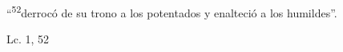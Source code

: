 \documentclass[../../rosario.tex]{subfiles}
\begin{document}
    ``\textsuperscript{52}derrocó de su trono a los potentados y enalteció a los humildes''.
    \begin{flushright}
    Lc. 1, 52       
    \end{flushright}
\end{document}
